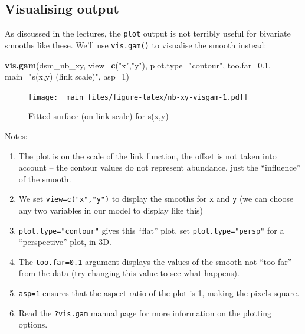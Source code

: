 \documentclass[]{book}
\newenvironment{Shaded}{\begin{snugshade}}{\end{snugshade}}
\newcommand{\KeywordTok}[1]{\textcolor[rgb]{0.13,0.29,0.53}{\textbf{#1}}}
\newcommand{\DataTypeTok}[1]{\textcolor[rgb]{0.13,0.29,0.53}{#1}}
\newcommand{\DecValTok}[1]{\textcolor[rgb]{0.00,0.00,0.81}{#1}}
\newcommand{\FloatTok}[1]{\textcolor[rgb]{0.00,0.00,0.81}{#1}}
\newcommand{\StringTok}[1]{\textcolor[rgb]{0.31,0.60,0.02}{#1}}
\newcommand{\NormalTok}[1]{#1}
\providecommand{\tightlist}{%
  \setlength{\itemsep}{0pt}\setlength{\parskip}{0pt}}
\theoremstyle{definition}
\theoremstyle{definition}
\theoremstyle{remark}
\begin{document}
\subsection{Visualising output}\label{visualising-output}

As discussed in the lectures, the \texttt{plot} output is not terribly
useful for bivariate smooths like these. We'll use \texttt{vis.gam()} to
visualise the smooth instead:

\begin{Shaded}
\begin{Highlighting}[]
\KeywordTok{vis.gam}\NormalTok{(dsm_nb_xy, }\DataTypeTok{view=}\KeywordTok{c}\NormalTok{(}\StringTok{"x"}\NormalTok{,}\StringTok{"y"}\NormalTok{), }\DataTypeTok{plot.type=}\StringTok{"contour"}\NormalTok{, }
        \DataTypeTok{too.far=}\FloatTok{0.1}\NormalTok{, }\DataTypeTok{main=}\StringTok{"s(x,y) (link scale)"}\NormalTok{, }\DataTypeTok{asp=}\DecValTok{1}\NormalTok{)}
\end{Highlighting}
\end{Shaded}

\begin{figure}
\centering
\texttt{[image: \_main\_files/figure-latex/nb-xy-visgam-1.pdf]}
\caption{\label{fig:nb-xy-visgam}Fitted surface (on link scale) for s(x,y)}
\end{figure}

Notes:

\begin{enumerate}
\def\labelenumi{\arabic{enumi}.}
\tightlist
\item
  The plot is on the scale of the link function, the offset is not taken
  into account -- the contour values do not represent abundance, just
  the ``influence'' of the smooth.
\item
  We set \texttt{view=c("x","y")} to display the smooths for \texttt{x}
  and \texttt{y} (we can choose any two variables in our model to
  display like this)
\item
  \texttt{plot.type="contour"} gives this ``flat'' plot, set
  \texttt{plot.type="persp"} for a ``perspective'' plot, in 3D.
\item
  The \texttt{too.far=0.1} argument displays the values of the smooth
  not ``too far'' from the data (try changing this value to see what
  happens).
\item
  \texttt{asp=1} ensures that the aspect ratio of the plot is 1, making
  the pixels square.
\item
  Read the \texttt{?vis.gam} manual page for more information on the
  plotting options.
\end{enumerate}
\end{document}
